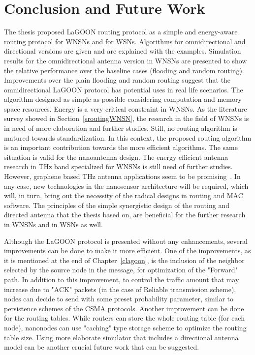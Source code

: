 \documentclass[12pt, oneandhalf, chaparabic, sees, ms]{metu}
\begin{document}
\chapter{Conclusion and Future Work}\label{cconc}
The thesis proposed LaGOON routing protocol as a simple and energy-aware routing protocol for WNSNs and for WSNs. 
Algorithms for omnidirectional and directional versions are given and are explained with the examples. 
Simulation results for the omnidirectional antenna version in WNSNs are presented to show the relative performance over the baseline cases (flooding and random routing). 
Improvements over the plain flooding and random routing suggest that the omnidirectional LaGOON protocol has potential uses in real life scenarios. 
The algorithm designed as simple as possible considering computation and memory space resources. Energy is a very critical constraint in WNSNs. As the literature survey
showed in Section~\ref{sroutingWNSN}, the research in the field of WNSNs is in need of more elaboration and further studies. Still, no routing algorithm is matured towards
standardization. In this context, the proposed routing algorithm is an important contribution towards the more efficient algorithms. 
The same situation is valid for the nanoantenna design. 
The energy efficient antenna research in THz band specialized for WNSNs is still need of further studies. 
However, graphene based THz antenna applications seem to be promising~\cite{serrano2017, jornet2013, jornet2010}. 
In any case, new technologies in the nanosensor architecture will be required, which will, in turn, bring out
the necessity of the radical designs in routing and MAC software. 
The principles of the simple synergistic design of the routing and directed antenna that the thesis based on, are beneficial
for the further research in WNSNs and in WSNs as well. 

%
%
Although the LaGOON protocol is presented without any enhancements, several improvements can be done to make it more efficient. 
One of the improvements, as it is mentioned at the end of Chapter~\ref{clagoon}, is the inclusion of the neighbor selected by the source node in the message, 
for optimization of the "Forward" path. In addition to this improvement, to control the traffic amount that may increase due to 
"ACK" packets (in the case of Reliable transmission scheme), nodes can decide to send with some preset probability parameter, 
similar to persistence schemes of the CSMA protocols. 
Another improvement can be done for the routing tables. 
While routers can store the whole routing table (for each node), nanonodes can use "caching" type storage scheme to optimize the routing table size. 
Using more elaborate simulator that includes a directional antenna model can be another crucial future work that can be suggested.
\end{document}
